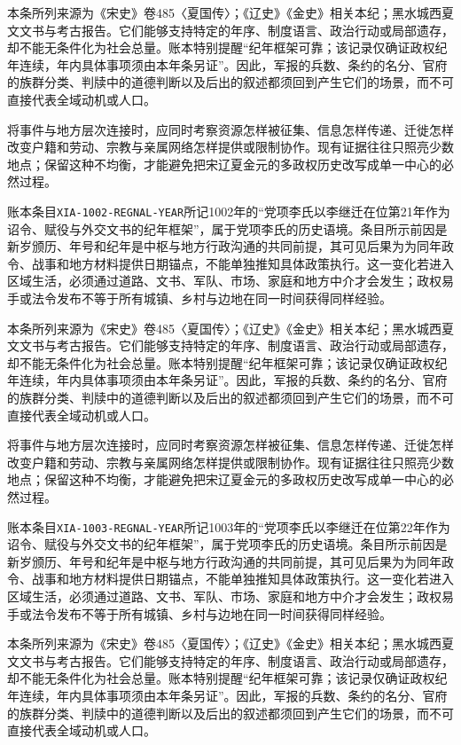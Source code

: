 本条所列来源为《宋史》卷485〈夏国传〉；《辽史》《金史》相关本纪；黑水城西夏文文书与考古报告。它们能够支持特定的年序、制度语言、政治行动或局部遗存，却不能无条件化为社会总量。账本特别提醒“纪年框架可靠；该记录仅确证政权纪年连续，年内具体事项须由本年条另证”。因此，军报的兵数、条约的名分、官府的族群分类、判牍中的道德判断以及后出的叙述都须回到产生它们的场景，而不可直接代表全域动机或人口。

将事件与地方层次连接时，应同时考察资源怎样被征集、信息怎样传递、迁徙怎样改变户籍和劳动、宗教与亲属网络怎样提供或限制协作。现有证据往往只照亮少数地点；保留这种不均衡，才能避免把宋辽夏金元的多政权历史改写成单一中心的必然过程。

账本条目\texttt{XIA-1002-REGNAL-YEAR}所记1002年的“党项李氏以李继迁在位第21年作为诏令、赋役与外交文书的纪年框架”，属于党项李氏的历史语境。条目所示前因是新岁颁历、年号和纪年是中枢与地方行政沟通的共同前提，其可见后果为为同年政令、战事和地方材料提供日期锚点，不能单独推知具体政策执行。这一变化若进入区域生活，必须通过道路、文书、军队、市场、家庭和地方中介才会发生；政权易手或法令发布不等于所有城镇、乡村与边地在同一时间获得同样经验。

本条所列来源为《宋史》卷485〈夏国传〉；《辽史》《金史》相关本纪；黑水城西夏文文书与考古报告。它们能够支持特定的年序、制度语言、政治行动或局部遗存，却不能无条件化为社会总量。账本特别提醒“纪年框架可靠；该记录仅确证政权纪年连续，年内具体事项须由本年条另证”。因此，军报的兵数、条约的名分、官府的族群分类、判牍中的道德判断以及后出的叙述都须回到产生它们的场景，而不可直接代表全域动机或人口。

将事件与地方层次连接时，应同时考察资源怎样被征集、信息怎样传递、迁徙怎样改变户籍和劳动、宗教与亲属网络怎样提供或限制协作。现有证据往往只照亮少数地点；保留这种不均衡，才能避免把宋辽夏金元的多政权历史改写成单一中心的必然过程。

账本条目\texttt{XIA-1003-REGNAL-YEAR}所记1003年的“党项李氏以李继迁在位第22年作为诏令、赋役与外交文书的纪年框架”，属于党项李氏的历史语境。条目所示前因是新岁颁历、年号和纪年是中枢与地方行政沟通的共同前提，其可见后果为为同年政令、战事和地方材料提供日期锚点，不能单独推知具体政策执行。这一变化若进入区域生活，必须通过道路、文书、军队、市场、家庭和地方中介才会发生；政权易手或法令发布不等于所有城镇、乡村与边地在同一时间获得同样经验。

本条所列来源为《宋史》卷485〈夏国传〉；《辽史》《金史》相关本纪；黑水城西夏文文书与考古报告。它们能够支持特定的年序、制度语言、政治行动或局部遗存，却不能无条件化为社会总量。账本特别提醒“纪年框架可靠；该记录仅确证政权纪年连续，年内具体事项须由本年条另证”。因此，军报的兵数、条约的名分、官府的族群分类、判牍中的道德判断以及后出的叙述都须回到产生它们的场景，而不可直接代表全域动机或人口。

